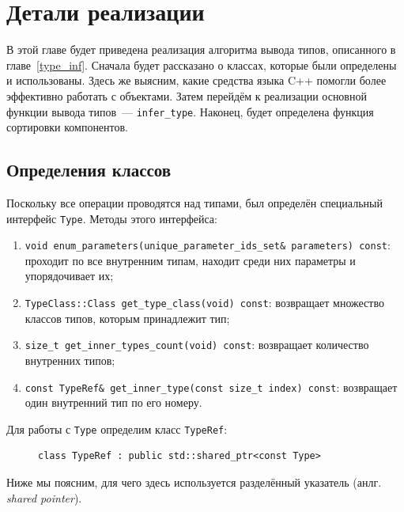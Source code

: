 \chapter{Детали реализации}
В этой главе будет приведена реализация алгоритма вывода типов, описанного в главе~\ref{type_inf}. Сначала будет рассказано о классах, которые были определены и использованы. Здесь же выясним, какие средства языка C++ помогли более эффективно работать с объектами. Затем перейдём к реализации основной функции вывода типов~--- \lstinline!infer_type!. Наконец, будет определена функция сортировки компонентов.  
\section{Определения классов}
Поскольку все операции проводятся над типами, был определён специальный интерфейс \lstinline!Type!. Методы этого интерфейса:
\begin{enumerate}[1)]
	\item \lstinline!void enum_parameters(unique_parameter_ids_set& parameters) const!: проходит по все внутренним типам, находит среди них параметры и упорядочивает их;
	\item \lstinline!TypeClass::Class get_type_class(void) const!: возвращает множество классов типов, которым принадлежит тип;
	\item  \lstinline!size_t get_inner_types_count(void) const!: возвращает количество внутренних типов;
	\item \lstinline!const TypeRef& get_inner_type(const size_t index) const!: возвращает один внутренний тип по его номеру.
\end{enumerate}

Для работы с \lstinline!Type! определим класс \lstinline!TypeRef!:
\begin{figure}[H]
	\begin{lstlisting}
class TypeRef : public std::shared_ptr<const Type>
	\end{lstlisting}
\end{figure}
Ниже мы поясним, для чего здесь используется разделённый указатель (анлг. \textit{shared pointer}).


